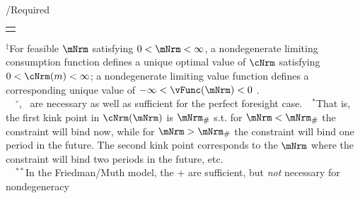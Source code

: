 \documentclass[\econtexRoot/BufferStockTheory]{subfiles}
\providecommand{\TblName}{}
\renewcommand{\TblName}{Required}
\begin{document}
\begin{verbatimwrite}{\TableDir/\TblName}
\begin{table}
{\begin{tabular}{|l|l|l|}
        \\ \hline \multicolumn{3}{c}{}
      \end{tabular}
    } %

    \settowidth\TableWidth{\usebox{\TblBox}}
    \savebox{\TblShrunkBox}{
      \settowidth{\TblShrunk}{\usebox{\TblBox}}
      \resizebox{\textwidth}{!}{\begin{minipage}{\TblShrunk}
          \usebox{\TblBox}
        \end{minipage}}
    }

    \usebox{\TblShrunkBox}


    \parbox{\textwidth}{\raggedright \footnotesize         $^{\ddagger}$For feasible $\mNrm$ satisfying $0 < \mNrm < \infty$, a nondegenerate limiting consumption function defines a unique optimal value of $\cNrm$ satisfying $0 < \cNrm(m) < \infty$; a nondegenerate limiting value function defines a corresponding unique value of $-\infty < \vFunc(\mNrm) < 0$ .\\
      ~~$^{\circ}${\RIC}, \FHWC~are necessary as well as sufficient for the perfect foresight case.~~$^{\ast}$That is, the first kink point in $\cNrm(\mNrm)$ is $\mNrm_{\#}$ s.t.
for $\mNrm < \mNrm_{\#}$ the constraint will bind now, while for $\mNrm > \mNrm_{\#}$ the constraint will bind one period in the future.
The second kink point corresponds to the $\mNrm$ where the constraint will bind two periods in the future, etc.\\
      ~~$^{\ast\ast}$In the Friedman/Muth model, the {\RIC}+{\FHWC} are sufficient, but \textit{not} necessary for nondegeneracy} 
  \end{table}
  
\end{verbatimwrite}
\clearpage

\end{document}
